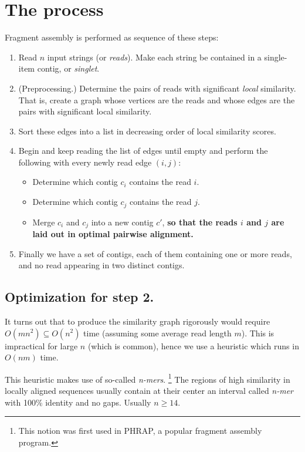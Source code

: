 \documentclass[11pt, oneside]{article}
\begin{document}
\section{The process}

Fragment assembly is performed as sequence of these steps:

\begin{enumerate}
\item
Read $n$ input strings (or \emph{reads}).
Make each string be contained in a single-item contig, or \emph{singlet}.
\item
(Preprocessing.)
Determine the pairs of reads with significant \emph{local} similarity. That is,
create a graph whose vertices are the reads and whose edges are the pairs with significant
local similarity.
\item
Sort these edges into a list in decreasing order of local similarity scores. 
\item
Begin and keep reading the list of edges until empty and perform the following with every
newly read edge $(i,j)$:  
 \begin{itemize}
 \item Determine which contig $c_i$ contains the read $i$.
 \item Determine which contig $c_j$ contains the read $j$.
 \item Merge $c_i$ and $c_j$ into a new contig $c'$, {\bf so that the reads $i$ and $j$ are
       laid out in optimal pairwise alignment.} 
 \end{itemize}
\item
Finally we have a set of contigs, each of them containing one or more reads, and no read
appearing in two distinct contigs.
\end{enumerate}

\subsection{Optimization for step 2.}

It turns out that to produce the similarity graph rigorously would require
$O(mn^2) \subseteq O(n^2)$ time (assuming some average read length $m$). This is impractical for
large $n$ (which is common), hence we use a heuristic which runs in $O(nm)$ time.

This heuristic makes use of so-called \emph{n-mers}.
\footnote{This notion was first used in PHRAP, a popular fragment assembly program.} 
The regions of high similarity in locally aligned sequences usually contain at their
center an interval called \emph{n-mer} with 100\% identity and no gaps. Usually $n \geq 14$.
\end{document}
